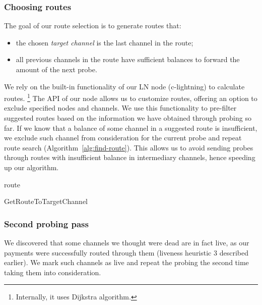 \subsubsection*{Choosing routes}
The goal of our route selection is to generate routes that:
\begin{itemize}
	\item the chosen \textit{target channel} is the last channel in the route;
	\item all previous channels in the route have sufficient balances to forward the amount of the next probe.
\end{itemize}

We rely on the built-in functionality of our LN node (c-lightning) to calculate routes.
\footnote{Internally, it uses Dijkstra algorithm.}
The API of our node allows us to customize routes, offering an option to exclude specified nodes and channels.
We use this functionality to pre-filter suggested routes based on the information we have obtained through probing so far.
If we know that a balance of some channel in a suggested route is insufficient, we exclude such channel from consideration for the current probe and repeat route search (Algorithm~\ref{alg:find-route}).
This allows us to avoid sending probes through routes with insufficient balance in intermediary channels, hence speeding up our algorithm.


\begin{algorithm}
	 {
	}
	\Return route\;
	\caption{GetRouteToTargetChannel}
	\label{alg:find-route}
\end{algorithm}

\subsubsection*{Second probing pass}
We discovered that some channels we thought were dead are in fact live, as our payments were successfully routed through them (liveness heuristic 3 described earlier).
We mark such channels as live and repeat the probing the second time taking them into consideration.

